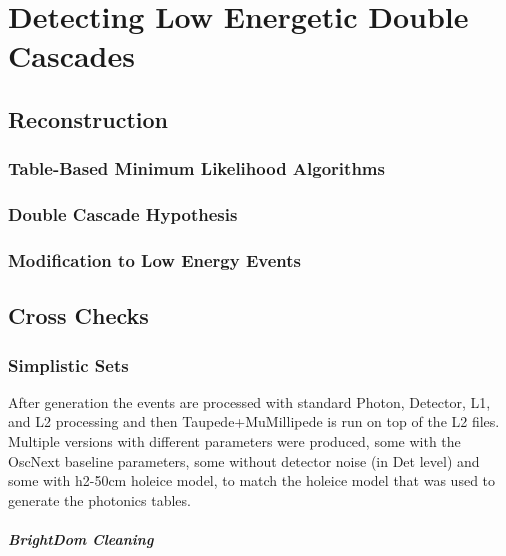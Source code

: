 \setchapterpreamble[u]{\margintoc}

\chapter{Detecting Low Energetic Double Cascades}


\section{Reconstruction}

\subsection{Table-Based Minimum Likelihood Algorithms}

\subsection{Double Cascade Hypothesis}

\subsection{Modification to Low Energy Events}

\section{Cross Checks}
\subsection{Simplistic Sets}

After generation the events are processed with standard Photon, Detector, L1, and L2 processing and then Taupede+MuMillipede is run on top of the L2 files. Multiple versions with different parameters were produced, some with the OscNext baseline parameters, some without detector noise (in Det level) and some with h2-50cm holeice model, to match the holeice model that was used to generate the photonics tables.


\paragraph{BrightDom Cleaning}

